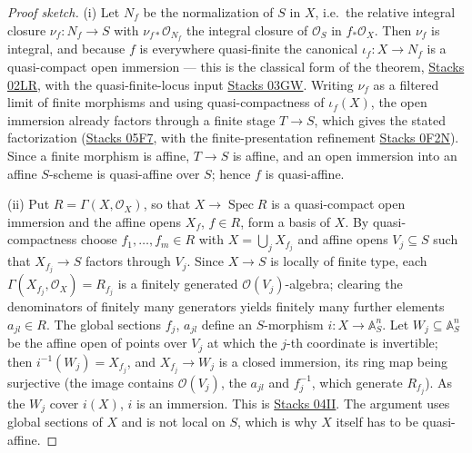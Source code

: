 \documentclass[11pt]{article}
\theoremstyle{plain}
\theoremstyle{definition}
\newcommand{\stacks}[1]{\href{https://stacks.math.columbia.edu/tag/#1}{Stacks #1}}
\begin{document}
\begin{proof}[Proof sketch]
(i)  Let $N_f$ be the normalization of $S$ in $X$, i.e.\ the relative
integral closure $\nu_f:N_f\to S$ with
$\nu_{f*}\mathcal O_{N_f}$ the integral closure of $\mathcal O_S$ in
$f_*\mathcal O_X$.  Then $\nu_f$ is integral, and because $f$ is everywhere
quasi-finite the canonical $\iota_f:X\to N_f$ is a quasi-compact open
immersion --- this is the classical form of the theorem, \stacks{02LR}, with
the quasi-finite-locus input \stacks{03GW}.  Writing $\nu_f$ as a filtered
limit of finite morphisms and using quasi-compactness of $\iota_f(X)$, the
open immersion already factors through a finite stage $T\to S$, which gives
the stated factorization (\stacks{05F7}, with the finite-presentation
refinement \stacks{0F2N}).  Since a finite morphism is affine, $T\to S$ is
affine, and an open immersion into an affine $S$-scheme is quasi-affine over
$S$; hence $f$ is quasi-affine.

(ii)  Put $R=\Gamma(X,\mathcal O_X)$, so that $X\to\operatorname{Spec}R$ is
a quasi-compact open immersion and the affine opens $X_f$, $f\in R$, form
a basis of $X$.  By quasi-compactness choose $f_1,\dots,f_m\in R$ with
$X=\bigcup_jX_{f_j}$ and affine opens $V_j\subseteq S$ such that
$X_{f_j}\to S$ factors through $V_j$.  Since $X\to S$ is locally of
finite type, each $\Gamma(X_{f_j},\mathcal O_X)=R_{f_j}$ is a finitely
generated $\mathcal O(V_j)$-algebra; clearing the denominators of finitely
many generators yields finitely many further elements $a_{jl}\in R$.  The
global sections $f_j$, $a_{jl}$ define an $S$-morphism
$i:X\to\mathbb A^n_S$.  Let $W_j\subseteq\mathbb A^n_S$ be the affine open
of points over $V_j$ at which the $j$-th coordinate is invertible; then
$i^{-1}(W_j)=X_{f_j}$, and $X_{f_j}\to W_j$ is a closed immersion, its
ring map being surjective (the image contains $\mathcal O(V_j)$, the
$a_{jl}$ and $f_j^{-1}$, which generate $R_{f_j}$).  As the $W_j$ cover
$i(X)$, $i$ is an immersion.  This is \stacks{04II}.  The argument uses
global sections of $X$ and is not local on $S$, which is why $X$ itself
has to be quasi-affine.
\end{proof}
\end{document}
